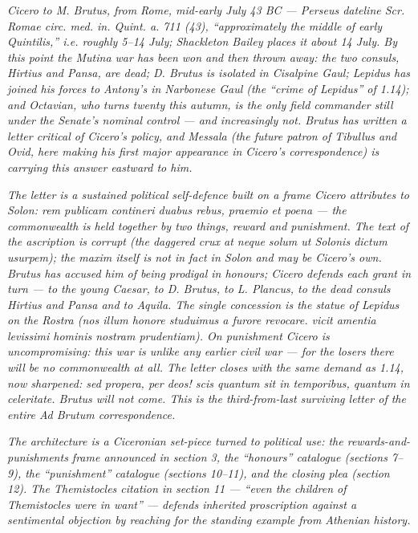 
\textit{Cicero to M. Brutus, from Rome, mid-early July
43 BC --- Perseus dateline \textit{Scr. Romae circ. med.
in. Quint. a. 711 (43)}, ``approximately the middle of
early Quintilis,'' i.e. roughly 5--14 July; Shackleton
Bailey places it about 14 July. By this point the
Mutina war has been won and then thrown away: the two
consuls, Hirtius and Pansa, are dead; D. Brutus is
isolated in Cisalpine Gaul; Lepidus has joined his
forces to Antony's in Narbonese Gaul (the ``crime of
Lepidus'' of 1.14); and Octavian, who turns twenty
this autumn, is the only field commander still under
the Senate's nominal control --- and increasingly not.
Brutus has written a letter critical of Cicero's
policy, and Messala (the future patron of Tibullus and
Ovid, here making his first major appearance in
Cicero's correspondence) is carrying this answer
eastward to him.}

\textit{The letter is a sustained political
self-defence built on a frame Cicero attributes to
Solon: \textit{rem publicam contineri duabus rebus,
praemio et poena} --- the commonwealth is held together
by two things, reward and punishment. The text of the
ascription is corrupt (the daggered crux at
\textit{neque solum ut Solonis dictum usurpem}); the
maxim itself is not in fact in Solon and may be
Cicero's own. Brutus has accused him of being prodigal
in honours; Cicero defends each grant in turn --- to
the young Caesar, to D. Brutus, to L. Plancus, to the
dead consuls Hirtius and Pansa and to Aquila. The
single concession is the statue of Lepidus on the
Rostra (\textit{nos illum honore studuimus a furore
revocare. vicit amentia levissimi hominis nostram
prudentiam}). On punishment Cicero is uncompromising:
this war is unlike any earlier civil war --- for the
losers there will be no commonwealth at all. The
letter closes with the same demand as 1.14, now
sharpened: \textit{sed propera, per deos! scis quantum
sit in temporibus, quantum in celeritate.} Brutus
will not come. This is the third-from-last surviving
letter of the entire \textit{Ad Brutum} correspondence.}

\textit{The architecture is a Ciceronian set-piece
turned to political use: the rewards-and-punishments
frame announced in section 3, the ``honours'' catalogue
(sections 7--9), the ``punishment'' catalogue (sections
10--11), and the closing plea (section 12). The
Themistocles citation in section 11 --- ``even the
children of Themistocles were in want'' --- defends
inherited proscription against a sentimental objection
by reaching for the standing example from Athenian
history.}
